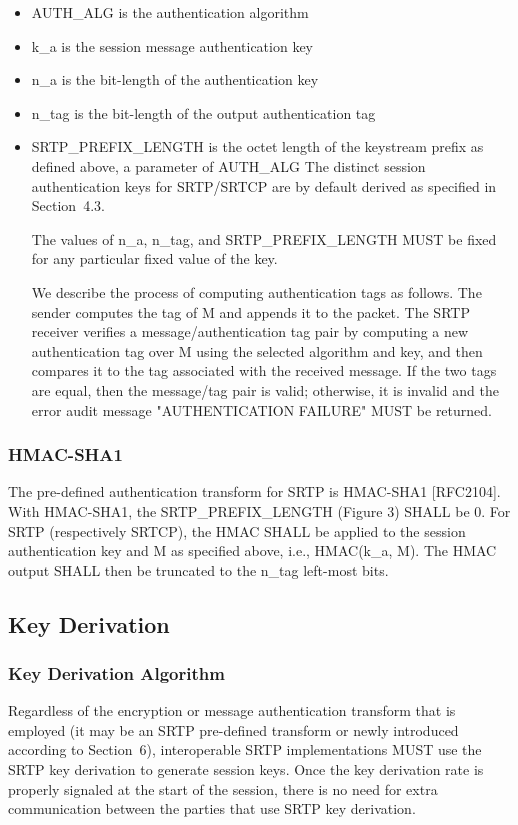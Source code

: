 \documentclass{article}
\begin{document}
\begin{itemize}
\item AUTH\_ALG is the authentication algorithm
\item k\_a is the session message authentication key
\item n\_a is the bit-length of the authentication key
\item n\_tag is the bit-length of the output authentication tag
\item SRTP\_PREFIX\_LENGTH is the octet length of the keystream prefix as defined above, a parameter of AUTH\_ALG
The distinct session authentication keys for SRTP/SRTCP are by default derived as specified in Section~4.3.

The values of n\_a, n\_tag, and SRTP\_PREFIX\_LENGTH MUST be fixed for any particular fixed value of the key.

We describe the process of computing authentication tags as follows. The sender computes the tag of M and appends it to the packet.  The SRTP receiver verifies a message/authentication tag pair by computing a new authentication tag over M using the selected algorithm and key, and then compares it to the tag associated with the received message. If the two tags are equal, then the message/tag pair is valid; otherwise, it is invalid and the error audit message "AUTHENTICATION FAILURE" MUST be returned.

\end{itemize}
\subsubsection{HMAC-SHA1}

The pre-defined authentication transform for SRTP is HMAC-SHA1 [RFC2104].  With HMAC-SHA1, the SRTP\_PREFIX\_LENGTH (Figure 3) SHALL be 0.  For SRTP (respectively SRTCP), the HMAC SHALL be applied to the session authentication key and M as specified above, i.e., HMAC(k\_a, M).  The HMAC output SHALL then be truncated to the n\_tag left-most bits.

\subsection{Key Derivation}

\subsubsection{Key Derivation Algorithm}

Regardless of the encryption or message authentication transform that is employed (it may be an SRTP pre-defined transform or newly introduced according to Section~6), interoperable SRTP implementations MUST use the SRTP key derivation to generate session keys.  Once the key derivation rate is properly signaled at the start of the session, there is no need for extra communication between the parties that use SRTP key derivation.
\end{document}
